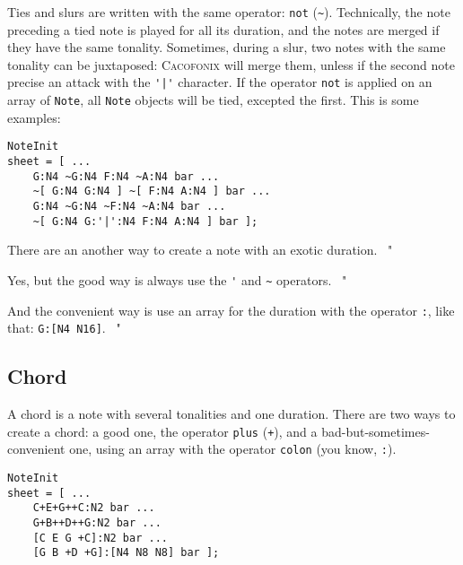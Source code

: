 \documentclass{article}
\newcommand\cacofonix{\textsc{Cacofonix}\xspace}
\newcommand\note{\lstinline!Note!\xspace}
\newenvironment{meenv}{ \par \noindent \makebox[6em][r]{ \textcolor{mecolor}{Me}: " --~}}{~"}
\newenvironment{myselfenv}{ \par \noindent \makebox[6em][r]{ \textcolor{myselfcolor}{Myself}: " --~}}{~"}
\newcommand{ \me }[1]{%
\begin{meenv}%
	#1%
\end{meenv} }
\begin{document}
Ties and slurs are written with the same operator: \lstinline!not! (\lstinline!~!). Technically, the note preceding a tied note is played for all its duration, and the notes are merged if they have the same tonality. Sometimes, during a slur, two notes with the same tonality can be juxtaposed: \cacofonix will merge them, unless if the second note precise an attack with the \lstinline!'|'! character. If the operator \lstinline!not! is applied on an array of \note, all \note objects will be tied, excepted the first. This is some examples: \\

\begin{lstlisting}
NoteInit
sheet = [ ...
	G:N4 ~G:N4 F:N4 ~A:N4 bar ...
	~[ G:N4 G:N4 ] ~[ F:N4 A:N4 ] bar ...
	G:N4 ~G:N4 ~F:N4 ~A:N4 bar ...
	~[ G:N4 G:'|':N4 F:N4 A:N4 ] bar ];
\end{lstlisting}

\me{There are an another way to create a note with an exotic duration.}
\begin{myselfenv}
	Yes, but the good way is always use the \lstinline!'! and \lstinline!~! operators.
\end{myselfenv}
\begin{meenv}
	And the convenient way is use an array for the duration with the operator \lstinline!:!, like that: \lstinline!G:[N4 N16]!.
\end{meenv}

\subsection{Chord}

A chord is a note with several tonalities and one duration. There are two ways to create a chord: a good one, the operator \lstinline!plus! (\lstinline!+!), and a bad-but-sometimes-convenient one, using an array with the operator \lstinline!colon! (you know, \lstinline!:!). \\

\begin{lstlisting}
NoteInit
sheet = [ ...
	C+E+G++C:N2 bar ...
	G+B++D++G:N2 bar ...
	[C E G +C]:N2 bar ...
	[G B +D +G]:[N4 N8 N8] bar ];
\end{lstlisting}
\end{document}
